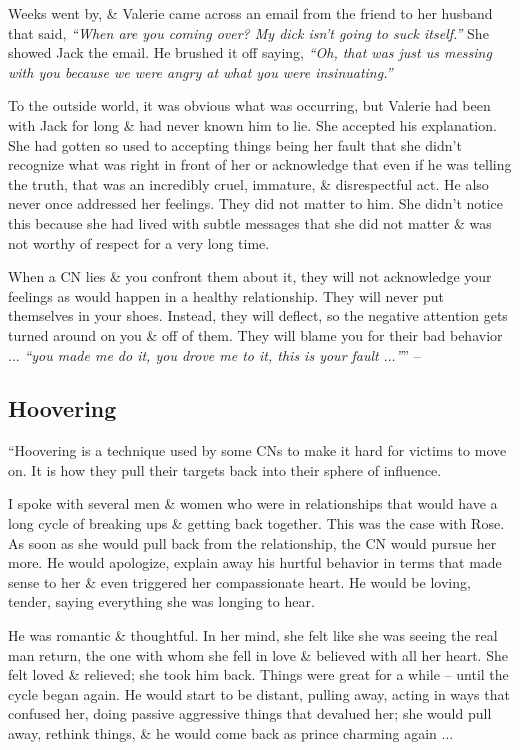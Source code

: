 \documentclass{article}
\numberwithin{equation}{section}
\begin{document}
Weeks went by, \& Valerie came across an email from the friend to her husband that said, \textit{``When are you coming over? My dick isn't going to suck itself.''} She showed Jack the email. He brushed it off saying, \textit{``Oh, that was just us messing with you because we were angry at what you were insinuating.''}

To the outside world, it was obvious what was occurring, but Valerie had been with Jack for long \& had never known him to lie. She accepted his explanation. She had gotten so used to accepting things being her fault that she didn't recognize what was right in front of her or acknowledge that even if he was telling the truth, that was an incredibly cruel, immature, \& disrespectful act. He also never once addressed her feelings. They did not matter to him. She didn't notice this because she had lived with subtle messages that she did not matter \& was not worthy of respect for a very long time.

When a CN lies \& you confront them about it, they will not acknowledge your feelings as would happen in a healthy relationship. They will never put themselves in your shoes. Instead, they will deflect, so the negative attention gets turned around on you \& off of them. They will blame you for their bad behavior $\ldots$ \textit{``you made me do it, you drove me to it, this is your fault $\ldots$''}'' -- \cite[pp. 52--54]{Mirza2017}

\subsection{Hoovering}
``Hoovering is a technique used by some CNs to make it hard for victims to move on. It is how they pull their targets back into their sphere of influence.

I spoke with several men \& women who were in relationships that would have a long cycle of breaking ups \& getting back together. This was the case with Rose. As soon as she would pull back from the relationship, the CN would pursue her more. He would apologize, explain away his hurtful behavior in terms that made sense to her \& even triggered her compassionate heart. He would be loving, tender, saying everything she was longing to hear.

He was romantic \& thoughtful. In her mind, she felt like she was seeing the real man return, the one with whom she fell in love \& believed with all her heart. She felt loved \& relieved; she took him back. Things were great for a while -- until the cycle began again. He would start to be distant, pulling away, acting in ways that confused her, doing passive aggressive things that devalued her; she would pull away, rethink things, \& he would come back as prince charming again $\ldots$
\end{document}
